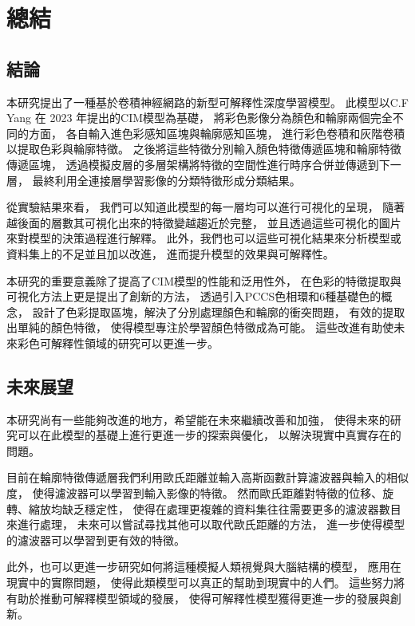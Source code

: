 \documentclass[class=NCU_thesis, crop=false]{standalone}
\begin{document}
\chapter{總結}
\section{結論}

本研究提出了一種基於卷積神經網路的新型可解釋性深度學習模型。
此模型以C.F Yang 在 2023 年提出的CIM模型\cite{YangCNNInterpretable}為基礎，
將彩色影像分為顏色和輪廓兩個完全不同的方面，
各自輸入進色彩感知區塊與輪廓感知區塊，
進行彩色卷積和灰階卷積以提取色彩與輪廓特徵。
之後將這些特徵分別輸入顏色特徵傳遞區塊和輪廓特徵傳遞區塊，
透過模擬皮層的多層架構將特徵的空間性進行時序合併並傳遞到下一層，
最終利用全連接層學習影像的分類特徵形成分類結果。

從實驗結果來看，
我們可以知道此模型的每一層均可以進行可視化的呈現，
隨著越後面的層數其可視化出來的特徵變越趨近於完整，
並且透過這些可視化的圖片來對模型的決策過程進行解釋。
此外，我們也可以這些可視化結果來分析模型或資料集上的不足並且加以改進，
進而提升模型的效果與可解釋性。

本研究的重要意義除了提高了CIM模型的性能和泛用性外，
在色彩的特徵提取與可視化方法上更是提出了創新的方法，
透過引入PCCS色相環和6種基礎色的概念，
設計了色彩提取區塊，解決了分別處理顏色和輪廓的衝突問題，
有效的提取出單純的顏色特徵，
使得模型專注於學習顏色特徵成為可能。
這些改進有助使未來彩色可解釋性領域的研究可以更進一步。

\section{未來展望}
本研究尚有一些能夠改進的地方，希望能在未來繼續改善和加強，
使得未來的研究可以在此模型的基礎上進行更進一步的探索與優化，
以解決現實中真實存在的問題。

目前在輪廓特徵傳遞層我們利用歐氏距離並輸入高斯函數計算濾波器與輸入的相似度，
使得濾波器可以學習到輸入影像的特徵。
然而歐氏距離對特徵的位移、旋轉、縮放均缺乏穩定性，
使得在處理更複雜的資料集往往需要更多的濾波器數目來進行處理，
未來可以嘗試尋找其他可以取代歐氏距離的方法，
進一步使得模型的濾波器可以學習到更有效的特徵。

此外，也可以更進一步研究如何將這種模擬人類視覺與大腦結構的模型，
應用在現實中的實際問題，
使得此類模型可以真正的幫助到現實中的人們。
這些努力將有助於推動可解釋模型領域的發展，
使得可解釋性模型獲得更進一步的發展與創新。
\end{document}

